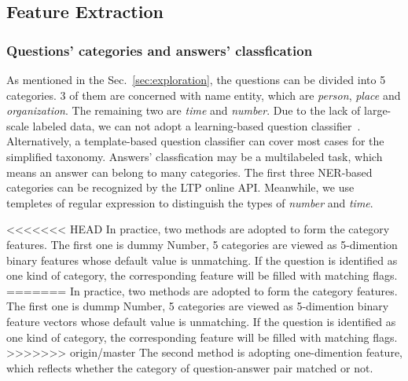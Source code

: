 \documentclass{llncs}
\begin{document}
\begin{table}[!htbp]
\begin{table}[!htbp]


\subsection{Feature Extraction}
\label{sec:feature}

\subsubsection{Questions' categories and answers' classfication}
\label{sec:categories}
As mentioned in the Sec.~\ref{sec:exploration}, 
the questions can be divided into 5 categories. 3 of them are concerned with name entity, which are \emph{person}, \emph{place} and \emph{organization}. The  remaining two are \emph{time} and \emph{number}. Due to the lack of large-scale labeled data, we can not adopt a learning-based question classifier~\cite{Li2003Learning}. Alternatively, a template-based question classifier can cover most cases for the simplified taxonomy. 
Answers' classfication may be a multilabeled task, which means an answer can belong to many categories. The first three NER-based categories can be recognized by the LTP online API. Meanwhile, we use templetes  of regular expression to distinguish the types of \emph{number} and \emph{time}. 

<<<<<<< HEAD
In practice, two methods are adopted to form the category features. The first one is dummy  Number, 5 categories are viewed as 5-dimention binary features whose default value is unmatching. If the question is identified as one kind of category, the corresponding feature will be filled with matching flags. 
=======
In practice, two methods are adopted to form the category features. The first one is dummp Number, 5 categories are viewed as 5-dimention binary feature vectors whose default value is unmatching. If the question is identified as one kind of category, the corresponding feature will be filled with matching flags. 
>>>>>>> origin/master
The second method is adopting one-dimention feature, which reflects whether the category of question-answer pair matched or not.



\end{table}
\end{table}
\end{document}
